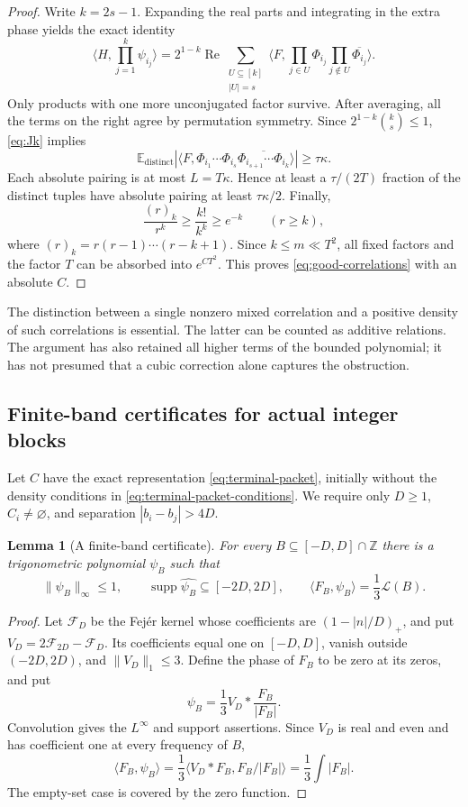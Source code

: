 \documentclass[11pt,reqno]{amsart}
\numberwithin{equation}{section}
\newtheorem{lemma}[theorem]{Lemma}
\theoremstyle{definition}
\theoremstyle{remark}
\newcommand{\Z}{\mathbb Z}
\newcommand{\E}{\mathbb E}
\newcommand{\La}{\mathcal L}
\newcommand{\norm}[1]{\lVert#1\rVert}
\newcommand{\ip}[2]{\langle#1,#2\rangle}
\DeclareMathOperator{\supp}{supp}
\DeclareMathOperator{\Rea}{Re}
\begin{document}
\begin{proof}
Write $k=2s-1$. Expanding the real parts and integrating in the extra
phase yields the exact identity
\begin{equation}\label{eq:balanced-identity}
 \ip H{\prod_{j=1}^k\psi_{i_j}}
 =2^{1-k}\Rea\sum_{\substack{U\subseteq[k]\\|U|=s}}
  \ip F{\prod_{j\in U}\Phi_{i_j}
                   \prod_{j\notin U}\overline{\Phi_{i_j}}}.
\end{equation}
Only products with one more unconjugated factor survive. After
averaging, all the terms on the right agree by permutation symmetry.
Since $2^{1-k}\binom{k}{s}\le1$, \eqref{eq:Jk} implies
\[
 \E_{\mathrm{distinct}}
 \left|\ip F{\Phi_{i_1}\cdots\Phi_{i_s}
       \overline{\Phi_{i_{s+1}}\cdots\Phi_{i_k}}}\right|
 \ge\tau\kappa.
\]
Each absolute pairing is at most $L=T\kappa$. Hence at least a
$\tau/(2T)$ fraction of the distinct tuples have absolute pairing at
least $\tau\kappa/2$. Finally,
\[
 \frac{(r)_k}{r^k}\ge\frac{k!}{k^k}\ge e^{-k}
 \qquad(r\ge k),
\]
where $(r)_k=r(r-1)\cdots(r-k+1)$. Since $k\le m\ll T^2$, all fixed
factors and the factor $T$ can be absorbed into $e^{CT^2}$. This proves
\eqref{eq:good-correlations} with an absolute $C$.
\end{proof}

The distinction between a single nonzero mixed correlation and a positive
density of such correlations is essential. The latter can be counted
as additive relations. The argument has also retained all higher terms
of the bounded polynomial; it has not presumed that a cubic correction
alone captures the obstruction.

\subsection{Finite-band certificates for actual integer blocks}

Let $C$ have the exact representation
\eqref{eq:terminal-packet}, initially without the density conditions
in \eqref{eq:terminal-packet-conditions}. We require only $D\ge1$,
$C_i\ne\varnothing$, and separation $|b_i-b_j|>4D$.

\begin{lemma}[A finite-band certificate]\label{lem:band}
For every $B\subseteq[-D,D]\cap\Z$ there is a trigonometric polynomial
$\psi_B$ such that
\[
 \norm{\psi_B}_\infty\le1,\qquad
 \supp\widehat{\psi_B}\subseteq[-2D,2D],\qquad
 \ip{F_B}{\psi_B}=\frac13\La(B).
\]
\end{lemma}
\begin{proof}
Let $\mathcal F_D$ be the Fej\'er kernel whose coefficients are
$(1-|n|/D)_+$, and put $V_D=2\mathcal F_{2D}-\mathcal F_D$.
Its coefficients equal one on $[-D,D]$, vanish outside $(-2D,2D)$,
and $\norm{V_D}_1\le3$. Define the phase of $F_B$ to be zero at its
zeros, and put
\[
 \psi_B=\frac13 V_D*\frac{F_B}{|F_B|}.
\]
Convolution gives the $L^\infty$ and support assertions. Since $V_D$ is
real and even and has coefficient one at every frequency of $B$,
\[
 \ip{F_B}{\psi_B}
 =\frac13\ip{V_D*F_B}{F_B/|F_B|}
 =\frac13\int|F_B|.
\]
The empty-set case is covered by the zero function.
\end{proof}
\end{document}
